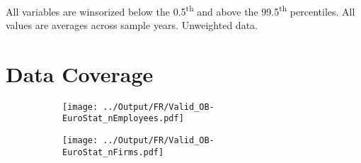 \documentclass[12pt,notitlepage]{article}
\begin{document}
\begin{table}[!htpb]
\caption{Unweighted French Summary Statistics}
\label{tab:selected-sum-stats_Nowgt_FR}
\tabularnewline \\
All variables are winsorized below the 0.5\textsuperscript{th} and above the 99.5\textsuperscript{th} percentiles. All values are averages across sample years. Unweighted data. 
\end{table}







\FloatBarrier
\section{Data Coverage} %
\label{sec:Data_Coverage}
\FloatBarrier

\FloatBarrier
\begin{figure}[!htpb]
\centering
\caption{France Data Coverage}
\begin{subfigure}{.49\textwidth}
    \centering
 \texttt{[image: ../Output/FR/Valid\_OB-EuroStat\_nEmployees.pdf]}
\end{subfigure}%
\begin{subfigure}{.49\textwidth}
    \centering
 \texttt{[image: ../Output/FR/Valid\_OB-EuroStat\_nFirms.pdf]}
\end{subfigure}%


\end{figure}
\end{document}
